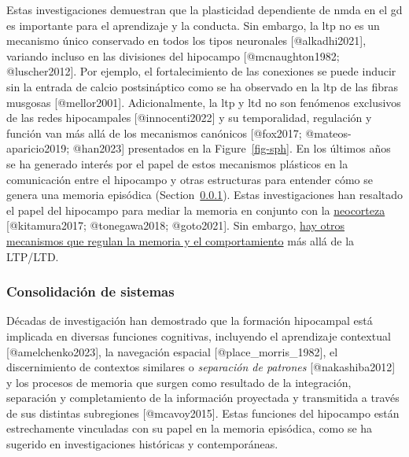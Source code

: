 \documentclass[
  11pt]{../MastersDoctoralThesisUNAM}
\begin{document}
Estas investigaciones demuestran que la plasticidad dependiente de
\ac{nmda} en el \ac{gd} es importante para el aprendizaje y la conducta.
Sin embargo, la \ac{ltp} no es un mecanismo único conservado en todos
los tipos neuronales {[}@alkadhi2021{]}, variando incluso en las
divisiones del hipocampo {[}@mcnaughton1982; @luscher2012{]}. Por
ejemplo, el fortalecimiento de las conexiones se puede inducir sin la
\colorbox{BurntOrange}{entrada} de calcio postsináptico como se ha
observado en la \ac{ltp} de las fibras musgosas {[}@mellor2001{]}.
Adicionalmente, la \ac{ltp} y \ac{ltd} no son fenómenos exclusivos de
las redes hipocampales {[}@innocenti2022{]} y su temporalidad,
regulación y función van más allá de los mecanismos canónicos
{[}@fox2017; @mateos-aparicio2019; @han2023{]} presentados en la
Figure~\ref{fig-sph}. En los últimos años se ha generado interés por el
papel de estos mecanismos plásticos en la comunicación entre el
hipocampo y otras estructuras para entender cómo se genera una memoria
episódica (Section~\ref{sec-consolidacion}). Estas investigaciones han
resaltado el papel del hipocampo para mediar la memoria en conjunto con
la \href{AppendixB.qmd\#term-id-69}{neocorteza} {[}@kitamura2017;
@tonegawa2018; @goto2021{]}. Sin embargo,
\hyperref[callout-reconsolidacion]{hay otros mecanismos que regulan la
memoria y el comportamiento} más allá de la LTP/LTD.

\subsubsection{Consolidación de sistemas}\label{sec-consolidacion}

Décadas de investigación han demostrado que la formación hipocampal está
implicada en diversas funciones cognitivas, incluyendo el aprendizaje
contextual {[}@amelchenko2023{]}, la navegación espacial
{[}@place\_morris\_1982{]}, el discernimiento de contextos similares o
\emph{separación de patrones} {[}@nakashiba2012{]} y los procesos de
memoria que surgen como resultado de la integración, separación y
completamiento de la información proyectada y transmitida a través de
sus distintas subregiones {[}@mcavoy2015{]}. Estas funciones del
hipocampo están estrechamente vinculadas con su papel en la memoria
episódica, como se ha sugerido en investigaciones históricas y
contemporáneas.
\end{document}
